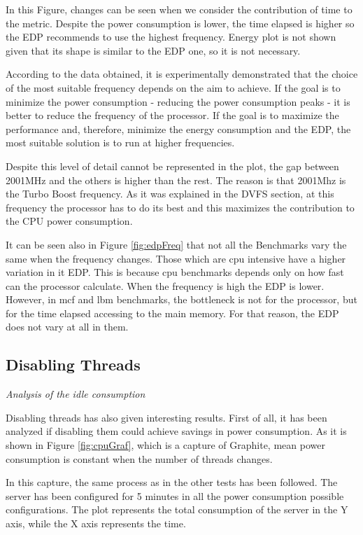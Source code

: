 In this Figure, changes can be seen when we consider the contribution of time to the metric. Despite the power consumption is lower, the time elapsed is higher so the EDP recommends to use the highest frequency. Energy plot is not shown given that its shape is similar to the EDP one, so it is not necessary.

According to the data obtained, it is experimentally demonstrated that the choice of the most suitable frequency depends on the aim to achieve. If the goal is to minimize the power consumption - reducing the power consumption peaks - it is better to reduce the frequency of the processor. If the goal is to maximize the performance and, therefore, minimize the energy consumption and the EDP, the most suitable solution is to run at higher frequencies.

Despite this level of detail cannot be represented in the plot, the gap between 2001MHz and the others is higher than the rest. The reason is that 2001Mhz is the Turbo Boost frequency. As it was explained in the DVFS section, at this frequency the processor has to do its best and this maximizes the contribution to the CPU power consumption.


It can be seen also in Figure \ref{fig:edpFreq} that not all the Benchmarks vary the same when the frequency changes. Those which are cpu intensive have a higher variation in it EDP. This is because cpu benchmarks depends only on how fast can the processor calculate. When the frequency is high the EDP is lower. However, in mcf and lbm benchmarks, the bottleneck is not for the processor, but for the time elapsed accessing to the main memory. For that reason, the EDP does not vary at all in them.


\subsection{Disabling Threads}


\emph{Analysis of the idle consumption}

Disabling threads has also given interesting results. First of all, it has been analyzed if disabling them could achieve savings in power consumption. As it is shown in Figure \ref{fig:cpuGraf}, which is a capture of Graphite, mean power consumption is constant when the number of threads changes.

In this capture, the same process as in the other tests has been followed. The server has been configured for 5 minutes in all the power consumption possible configurations. The plot represents the total consumption of the server in the Y axis, while the X axis represents the time.

